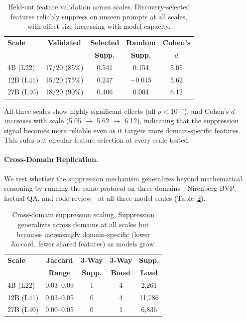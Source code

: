 \documentclass[10pt,twocolumn]{article}
\begin{document}
\begin{table}[t]
\centering
\caption{Held-out feature validation across scales. Discovery-selected features reliably suppress on unseen prompts at all scales, with effect size increasing with model capacity.}
\label{tab:heldout}
\small
\begin{tabular}{@{}lcccc@{}}
\toprule
\textbf{Scale} & \textbf{Validated} & \textbf{Selected} & \textbf{Random} & \textbf{Cohen's} \\
 & & \textbf{Supp.} & \textbf{Supp.} & $d$ \\
\midrule
4B (L22)  & 17/20 (85\%) & 0.541 & 0.154 & 5.05 \\
12B (L41) & 15/20 (75\%) & 0.247 & $-$0.015 & 5.62 \\
27B (L40) & 18/20 (90\%) & 0.406 & 0.004 & 6.12 \\
\bottomrule
\end{tabular}
\end{table}

All three scales show highly significant effects (all $p < 10^{-5}$), and Cohen's $d$ \emph{increases} with scale (5.05 $\to$ 5.62 $\to$ 6.12), indicating that the suppression signal becomes more reliable even as it targets more domain-specific features.
This rules out circular feature selection at every scale tested.

\paragraph{Cross-Domain Replication.}
We test whether the suppression mechanism generalizes beyond mathematical reasoning by running the same protocol on three domains---Nirenberg BVP, factual QA, and code review---at all three model scales (Table~\ref{tab:crossdomain}).

\begin{table}[t]
\centering
\caption{Cross-domain suppression scaling. Suppression generalizes across domains at all scales but becomes increasingly domain-specific (lower Jaccard, fewer shared features) as models grow.}
\label{tab:crossdomain}
\small
\begin{tabular}{@{}lcccc@{}}
\toprule
\textbf{Scale} & \textbf{Jaccard} & \textbf{3-Way} & \textbf{3-Way} & \textbf{Supp.} \\
 & \textbf{Range} & \textbf{Supp.} & \textbf{Boost} & \textbf{Load} \\
\midrule
4B (L22)  & 0.03--0.09 & 1 & 4 & 2,261 \\
12B (L41) & 0.03--0.05 & 0 & 4 & 11,786 \\
27B (L40) & 0.00--0.05 & 0 & 1 & 6,836 \\
\bottomrule
\end{tabular}
\end{table}
\end{document}
